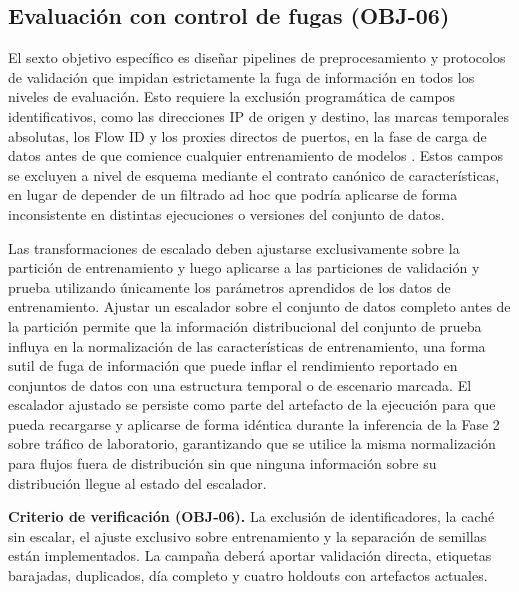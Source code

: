 \subsection{Evaluación con control de fugas (OBJ-06)}
El sexto objetivo específico es diseñar pipelines de preprocesamiento y protocolos de validación que impidan estrictamente la fuga de información en todos los niveles de evaluación. Esto requiere la exclusión programática de campos identificativos, como las direcciones IP de origen y destino, las marcas temporales absolutas, los Flow ID y los proxies directos de puertos, en la fase de carga de datos antes de que comience cualquier entrenamiento de modelos \parencite{Arp2020DosDontsMLSecurity,Kaufman2011LeakageDataMining}. Estos campos se excluyen a nivel de esquema mediante el contrato canónico de características, en lugar de depender de un filtrado ad hoc que podría aplicarse de forma inconsistente en distintas ejecuciones o versiones del conjunto de datos.

Las transformaciones de escalado deben ajustarse exclusivamente sobre la partición de entrenamiento y luego aplicarse a las particiones de validación y prueba utilizando únicamente los parámetros aprendidos de los datos de entrenamiento. Ajustar un escalador sobre el conjunto de datos completo antes de la partición permite que la información distribucional del conjunto de prueba influya en la normalización de las características de entrenamiento, una forma sutil de fuga de información que puede inflar el rendimiento reportado en conjuntos de datos con una estructura temporal o de escenario marcada. El escalador ajustado se persiste como parte del artefacto de la ejecución para que pueda recargarse y aplicarse de forma idéntica durante la inferencia de la Fase 2 sobre tráfico de laboratorio, garantizando que se utilice la misma normalización para flujos fuera de distribución sin que ninguna información sobre su distribución llegue al estado del escalador.

\textbf{Criterio de verificación (OBJ-06).} La exclusión de identificadores, la caché sin escalar, el ajuste exclusivo sobre entrenamiento y la separación de semillas están implementados. La campaña deberá aportar validación directa, etiquetas barajadas, duplicados, día completo y cuatro holdouts con artefactos actuales.

